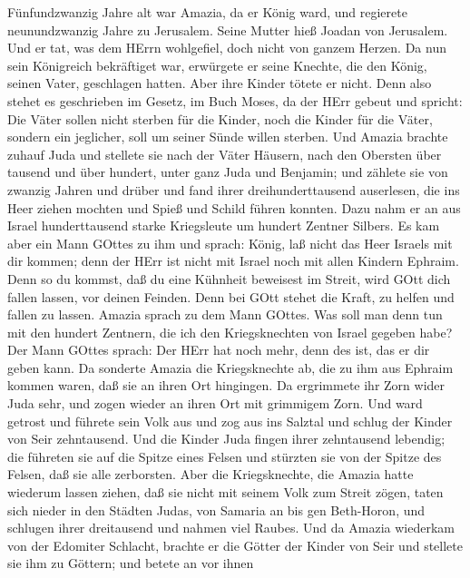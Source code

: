  Fünfundzwanzig Jahre alt war Amazia, da er König ward, und
regierete neunundzwanzig Jahre zu Jerusalem. Seine Mutter hieß Joadan
von Jerusalem.  Und er tat, was dem HErrn wohlgefiel, doch
nicht von ganzem Herzen.  Da nun sein Königreich bekräftiget
war, erwürgete er seine Knechte, die den König, seinen Vater, geschlagen
hatten.  Aber ihre Kinder tötete er nicht. Denn also stehet
es geschrieben im Gesetz, im Buch Moses, da der HErr gebeut und spricht:
Die Väter sollen nicht sterben für die Kinder, noch die Kinder für die
Väter, sondern ein jeglicher, soll um seiner Sünde willen sterben.
 Und Amazia brachte zuhauf Juda und stellete sie nach der
Väter Häusern, nach den Obersten über tausend und über hundert, unter
ganz Juda und Benjamin; und zählete sie von zwanzig Jahren und drüber
und fand ihrer dreihunderttausend auserlesen, die ins Heer ziehen
mochten und Spieß und Schild führen konnten.  Dazu nahm er
an aus Israel hunderttausend starke Kriegsleute um hundert Zentner
Silbers.  Es kam aber ein Mann GOttes zu ihm und sprach:
König, laß nicht das Heer Israels mit dir kommen; denn der HErr ist
nicht mit Israel noch mit allen Kindern Ephraim.  Denn so du
kommst, daß du eine Kühnheit beweisest im Streit, wird GOtt dich fallen
lassen, vor deinen Feinden. Denn bei GOtt stehet die Kraft, zu helfen
und fallen zu lassen.  Amazia sprach zu dem Mann GOttes. Was
soll man denn tun mit den hundert Zentnern, die ich den Kriegsknechten
von Israel gegeben habe? Der Mann GOttes sprach: Der HErr hat noch mehr,
denn des ist, das er dir geben kann.  Da sonderte Amazia
die Kriegsknechte ab, die zu ihm aus Ephraim kommen waren, daß sie an
ihren Ort hingingen. Da ergrimmete ihr Zorn wider Juda sehr, und zogen
wieder an ihren Ort mit grimmigem Zorn.  Und ward getrost
und führete sein Volk aus und zog aus ins Salztal und schlug der Kinder
von Seir zehntausend.  Und die Kinder Juda fingen ihrer
zehntausend lebendig; die führeten sie auf die Spitze eines Felsen und
stürzten sie von der Spitze des Felsen, daß sie alle zerborsten.
 Aber die Kriegsknechte, die Amazia hatte wiederum lassen
ziehen, daß sie nicht mit seinem Volk zum Streit zögen, taten sich
nieder in den Städten Judas, von Samaria an bis gen Beth-Horon, und
schlugen ihrer dreitausend und nahmen viel Raubes.  Und da
Amazia wiederkam von der Edomiter Schlacht, brachte er die Götter der
Kinder von Seir und stellete sie ihm zu Göttern; und betete an vor ihnen
